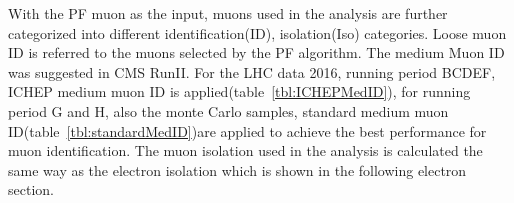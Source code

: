 With the PF muon as the input, muons used in the analysis are further categorized into different identification(ID), isolation(Iso) categories. Loose muon ID is referred to the muons selected by the PF algorithm. The medium Muon ID was suggested in CMS RunII. For the LHC data 2016, running period BCDEF, ICHEP medium muon ID is applied(table~\ref{tbl:ICHEPMedID}), for running period G and H, also the monte Carlo samples, standard medium muon ID(table~\ref{tbl:standardMedID})are applied to achieve the best performance for muon identification. The muon isolation used in the analysis is calculated the same way as the electron isolation which is shown in the following electron section.






